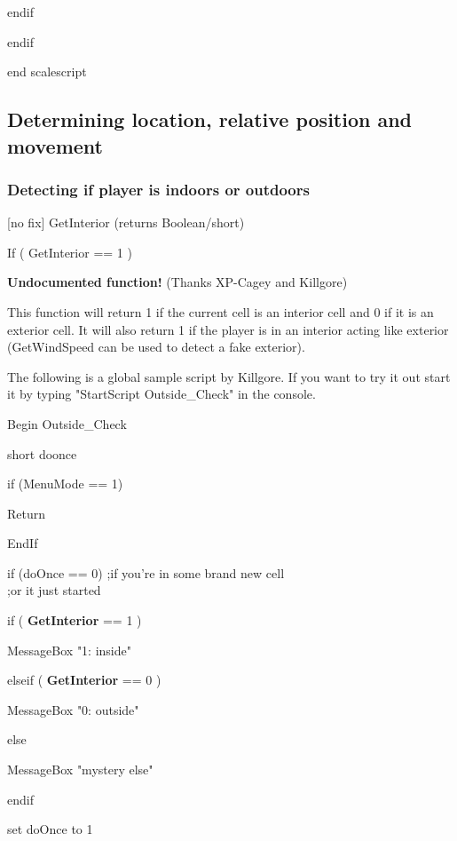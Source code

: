 \documentclass[
]{article}
\begin{document}
endif

endif

end scalescript

\hypertarget{determining-location-relative-position-and-movement}{%
\subsection{\texorpdfstring{\hfill\break
Determining location, relative position and
movement}{ Determining location, relative position and movement}}\label{determining-location-relative-position-and-movement}}

\hypertarget{detecting-if-player-is-indoors-or-outdoors}{%
\subsubsection{Detecting if player is indoors or
outdoors}\label{detecting-if-player-is-indoors-or-outdoors}}

{[}no fix{]} GetInterior (returns Boolean/short)

If ( GetInterior == 1 )

\textbf{Undocumented function!} (Thanks XP-Cagey and Killgore)

This function will return 1 if the current cell is an interior cell and
0 if it is an exterior cell. It will also return 1 if the player is in
an interior acting like exterior (GetWindSpeed can be used to detect a
fake exterior).

The following is a global sample script by Killgore. If you want to try
it out start it by typing "StartScript Outside\_Check" in the console.

Begin Outside\_Check

short doonce

if (MenuMode == 1)

Return

EndIf

if (doOnce == 0) ;if you're in some brand new cell\\
;or it just started

if ( \textbf{GetInterior} == 1 )

MessageBox "1: inside"

elseif ( \textbf{GetInterior} == 0 )

MessageBox "0: outside"

else

MessageBox "mystery else"

endif

set doOnce to 1
\end{document}

